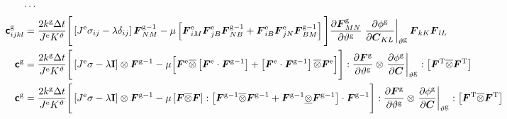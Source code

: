 \documentclass[10pt,letterpaper,oneside]{report}
\newcommand{\ten}[1]{\mbox{\boldmath $#1$}{}}
\newcommand{\tenf}[1]{\mbox{{\sffamily{\bfseries {#1}}}}}
\newcommand{\scas}[1]{\mbox{{\scriptsize{${\rm{#1}}$}}}{}}
\begin{document}
\begin{itemize}
\begin{align}
\cdots{}& \notag \\
\tenf{c}^{\scas{g}}_{ijkl} ={}& \frac{2 k^{\scas{g}} \Delta t}{ J^{\scas{e}} K^\vartheta } \Bigg[ \left[ J^{\scas{e}} \sigma_{ij} - \lambda \delta_{ij} \right] \ten{F}^{\scas{g}-1}_{NM} - \mu \left[ \ten{F}^{\scas{e}}_{iM} \ten{F}^{\scas{e}}_{jB} \ten{F}^{\scas{g}-1}_{NB} + \ten{F}^{\scas{e}}_{iB} \ten{F}^{\scas{e}}_{jN} \ten{F}^{\scas{g}-1}_{BM} \right] \Bigg] 
\frac{\partial \ten{F}^{\scas{g}}_{MN}}{\partial \vartheta^{\scas{g}}} \left. \frac{\partial \phi^{\scas{g}} }{\partial \ten{C}_{KL}} \right|_{\vartheta^{\scas{g}}} \ten{F}_{kK} \ten{F}_{lL} 
\\
\tenf{c}^{\scas{g}} ={}& \frac{2 k^{\scas{g}} \Delta t}{ J^{\scas{e}} K^\vartheta } \Bigg[ \left[ J^{\scas{e}} \sigma - \lambda \mathbf{I} \right] \otimes \ten{F}^{\scas{g}-1} - \mu \Big[ \ten{F}^{\scas{e}} \overline{\otimes} \left[ \ten{F}^{\scas{e}} \cdot \ten{F}^{\scas{g}-1} \right] + \left[ \ten{F}^{\scas{e}} \cdot \ten{F}^{\scas{g}-1} \right] \overline{\otimes} \ten{F}^{\scas{e}} \Big] \Bigg] : \frac{ \partial \ten{F}^{\scas{g}} }{ \partial \vartheta^{\scas{g}} } \otimes \left. \frac{ \partial \phi^{\scas{g}} }{ \partial \ten{C} } \right|_{\vartheta^{\scas{g}}} : \left[ \ten{F}^{\scas{T}} \overline{\otimes} \ten{F}^{\scas{T}} \right]
\\
\tenf{c}^{\scas{g}} ={}& \frac{2 k^{\scas{g}} \Delta t}{ J^{\scas{e}} K^\vartheta } \Bigg[ \left[ J^{\scas{e}} \sigma - \lambda \mathbf{I} \right] \otimes \ten{F}^{\scas{g}-1} - \mu \left[ \ten{F} \overline{\otimes} \ten{F} \right] : \left[ \ten{F}^{\scas{g}-1} \overline{\otimes} \ten{F}^{\scas{g}-1} + \ten{F}^{\scas{g}-1} \underline{\otimes} \ten{F}^{\scas{g}-1} \right] \cdot \ten{F}^{\scas{g}-1} \Bigg] : \frac{ \partial \ten{F}^{\scas{g}} }{ \partial \vartheta^{\scas{g}} } \otimes \left. \frac{ \partial \phi^{\scas{g}} }{ \partial \ten{C} } \right|_{\vartheta^{\scas{g}}} : \left[ \ten{F}^{\scas{T}} \overline{\otimes} \ten{F}^{\scas{T}} \right]

\end{align}
\end{itemize}
\end{document}
